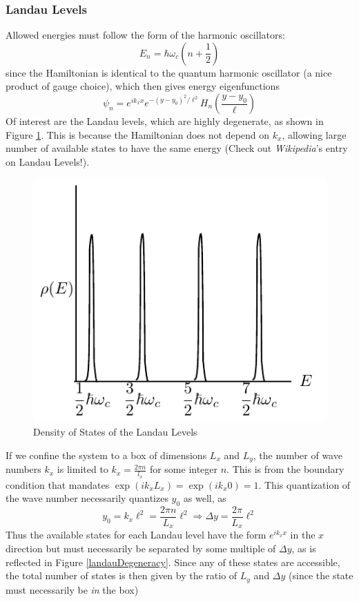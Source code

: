 \documentclass{article}
\begin{document}
	\subsubsection{Landau Levels}
 	Allowed energies must follow the form of the harmonic oscillators:
	$$E_n=\hbar\omega_c\left(n+\frac{1}{2}\right)$$
	since the Hamiltonian is identical to the quantum harmonic oscillator (a nice product of gauge choice), which then gives energy eigenfunctions
	$$\psi_n=e^{ik_xx}e^{-(y-y_0)^2/\ell^2}H_n\left(\frac{y-y_0}{\ell}\right)$$
	Of interest are the Landau levels, which are highly degenerate, as shown in Figure \ref{landauLevels}. This is because the Hamiltonian does not depend on $k_x$, allowing large number of available states to have the same energy (Check out \emph{Wikipedia}'s entry on Landau Levels!).
	\begin{figure}[h]
		\centering
		\includegraphics{landauLevels.pdf}
		\caption{Density of States of the Landau Levels}
		\label{landauLevels}
	\end{figure}
	If we confine the system to a box of dimensions $L_x$ and $L_y$, the number of wave numbers $k_x$ is limited to $k_x=\frac{2\pi n}{l_x}$ for some integer $n$. This is from the boundary condition that mandates $\exp(ik_xL_x)=\exp(ik_x0)=1$. This quantization of the wave number necessarily quantizes $y_0$ as well, as
	$$y_0=k_x\ell^2=\frac{2\pi n}{L_x}\ell^2 \Rightarrow \Delta y=\frac{2\pi}{L_x}\ell^2$$
	Thus the available states for each Landau level have the form $e^{ik_xx}$ in the $x$ direction but must necessarily be separated by some multiple of $\Delta y$, as is reflected in Figure \ref{landauDegeneracy}. Since any of these states are accessible, the total number of states is then given by the ratio of $L_y$ and $\Delta y$ (since the state must necessarily be \emph{in} the box)
\end{document}

